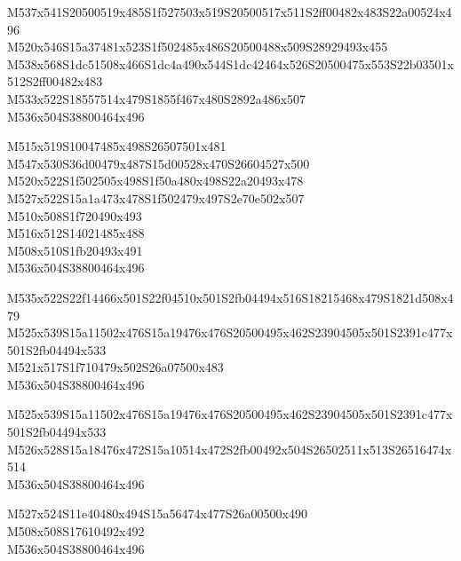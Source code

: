 \documentclass{article}
\begin{document}
\begin{multicols}{5}
\begin{center}
M537x541S20500519x485S1f527503x519S20500517x511S2ff00482x483S22a00524x496 %
\\M520x546S15a37481x523S1f502485x486S20500488x509S28929493x455 %
\\M538x568S1dc51508x466S1dc4a490x544S1dc42464x526S20500475x553S22b03501x512S2ff00482x483 %
\\M533x522S18557514x479S1855f467x480S2892a486x507 %
\\M536x504S38800464x496 %

M515x519S10047485x498S26507501x481 %
\\M547x530S36d00479x487S15d00528x470S26604527x500 %
\\M520x522S1f502505x498S1f50a480x498S22a20493x478 %
\\M527x522S15a1a473x478S1f502479x497S2e70e502x507 %
\\M510x508S1f720490x493 %
\\M516x512S14021485x488 %
\\M508x510S1fb20493x491 %
\\M536x504S38800464x496 %

M535x522S22f14466x501S22f04510x501S2fb04494x516S18215468x479S1821d508x479 %
\\M525x539S15a11502x476S15a19476x476S20500495x462S23904505x501S2391c477x501S2fb04494x533 %
\\M521x517S1f710479x502S26a07500x483 %
\\M536x504S38800464x496 %

M525x539S15a11502x476S15a19476x476S20500495x462S23904505x501S2391c477x501S2fb04494x533 %
\\M526x528S15a18476x472S15a10514x472S2fb00492x504S26502511x513S26516474x514 %
\\M536x504S38800464x496 %

M527x524S11e40480x494S15a56474x477S26a00500x490 %
\\M508x508S17610492x492 %
\\M536x504S38800464x496 %


\end{center}
\end{multicols}
\end{document}
